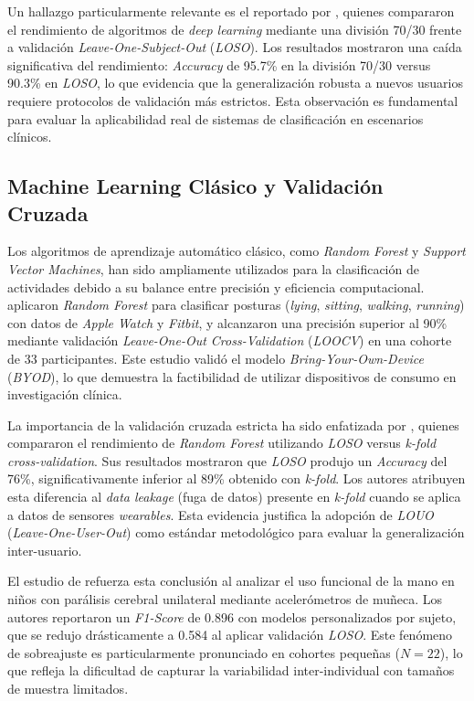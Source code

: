 Un hallazgo particularmente relevante es el reportado por \cite{Bassani2025DLHAR}, quienes compararon el rendimiento de algoritmos de \textit{deep learning} mediante una división 70/30 frente a validación \textit{Leave-One-Subject-Out} (\textit{LOSO}). Los resultados mostraron una caída significativa del rendimiento: \textit{Accuracy} de 95.7\% en la división 70/30 versus 90.3\% en \textit{LOSO}, lo que evidencia que la generalización robusta a nuevos usuarios requiere protocolos de validación más estrictos. Esta observación es fundamental para evaluar la aplicabilidad real de sistemas de clasificación en escenarios clínicos.

\subsection{Machine Learning Clásico y Validación Cruzada}
\label{subsec:ml_clasico}

Los algoritmos de aprendizaje automático clásico, como \textit{Random Forest} y \textit{Support Vector Machines}, han sido ampliamente utilizados para la clasificación de actividades debido a su balance entre precisión y eficiencia computacional. \cite{Fuller2021Predicting} aplicaron \textit{Random Forest} para clasificar posturas (\textit{lying}, \textit{sitting}, \textit{walking}, \textit{running}) con datos de \textit{Apple Watch} y \textit{Fitbit}, y alcanzaron una precisión superior al 90\% mediante validación \textit{Leave-One-Out Cross-Validation} (\textit{LOOCV}) en una cohorte de 33 participantes. Este estudio validó el modelo \textit{Bring-Your-Own-Device} (\textit{BYOD}), lo que demuestra la factibilidad de utilizar dispositivos de consumo en investigación clínica.

La importancia de la validación cruzada estricta ha sido enfatizada por \cite{Rehman2024LOSO}, quienes compararon el rendimiento de \textit{Random Forest} utilizando \textit{LOSO} versus \textit{k-fold cross-validation}. Sus resultados mostraron que \textit{LOSO} produjo un \textit{Accuracy} del 76\%, significativamente inferior al 89\% obtenido con \textit{k-fold}. Los autores atribuyen esta diferencia al \textit{data leakage} (fuga de datos) presente en \textit{k-fold} cuando se aplica a datos de sensores \textit{wearables}. Esta evidencia justifica la adopción de \textit{LOUO} (\textit{Leave-One-User-Out}) como estándar metodológico para evaluar la generalización inter-usuario.

El estudio de \cite{Mathew2024LOSO} refuerza esta conclusión al analizar el uso funcional de la mano en niños con parálisis cerebral unilateral mediante acelerómetros de muñeca. Los autores reportaron un \textit{F1-Score} de 0.896 con modelos personalizados por sujeto, que se redujo drásticamente a 0.584 al aplicar validación \textit{LOSO}. Este fenómeno de sobreajuste es particularmente pronunciado en cohortes pequeñas ($N=22$), lo que refleja la dificultad de capturar la variabilidad inter-individual con tamaños de muestra limitados.

